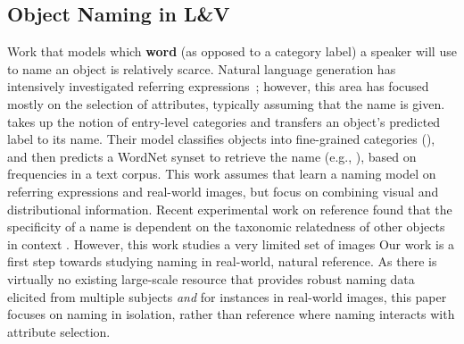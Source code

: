 \subsection{Object Naming in L\&V} 

Work that models which \textbf{word} (as opposed to a category label) a speaker will use to name an object is relatively scarce.
Natural language generation has intensively investigated referring expressions~\cite{dale:1995,krahmer:2012}; however, this area has focused mostly on the selection of attributes, typically assuming that the name is given.
 takes up the notion of entry-level categories and transfers an object's predicted label to its name.
Their model classifies objects into fine-grained categories (), and then predicts a WordNet synset to retrieve the name (e.g., ), based on frequencies in a text corpus.
This work assumes that 
  learn a naming model on referring expressions and real-world images, but focus on combining visual and distributional information. 
Recent experimental work on reference found that the specificity of a name is dependent on the taxonomic relatedness of other objects in context
\cite{rohde2012communicating,graf2016animal}. 
However, this work studies a very limited set of images 
Our work is a first step towards studying naming in real-world, natural reference.
As there is virtually no existing large-scale resource that provides robust naming data elicited from multiple subjects \textit{and} for instances in real-world images, this paper focuses on naming in isolation, rather than reference where naming interacts with attribute selection.

